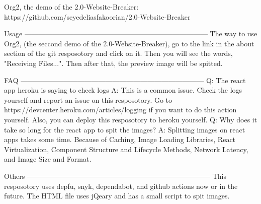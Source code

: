 Org2, the demo of the 2.0-Website-Breaker:
https://github.com/seyedeliasfakoorian/2.0-Website-Breaker

Usage
------------------------------------------------------------------------------
The way to use Org2, (the seccond demo of the 2.0-Website-Breaker), 
go to the link in the about section of the git resposotory and click on
it. Then you will see the words, "Receiving Files...". Then after that, 
the preview image will be spitted.

FAQ
------------------------------------------------------------------------------
Q: The react app heroku is saying to check logs
A: This is a common issue. Check the logs yourself and report an issue
   on this resposotory. Go to https://devcenter.heroku.com/articles/logging
   if you want to do this action yourself. Also, you can deploy this 
   resposotory to heroku yourself.
Q: Why does it take so long for the react app to spit the images?
A: Splitting images on react apps takes some time. Because of Caching,
   Image Loading Libraries, React Virtualization,
   Component Structure and Lifecycle Methods, Network Latency, and
   Image Size and Format.

Others
------------------------------------------------------------------------------
This resposotory uses depfu, snyk, dependabot, and github actions now
or in the future.
The HTML file uses jQeary and has a small script to spit images.
